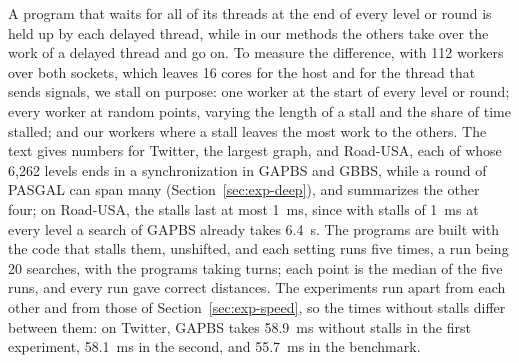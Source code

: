A program that waits for all of its threads at the end of every level or round is held up by each delayed thread, while in our methods the others take over the work of a delayed thread and go on. To measure the difference, with 112 workers over both sockets, which leaves 16 cores for the host and for the thread that sends signals, we stall on purpose: one worker at the start of every level or round; every worker at random points, varying the length of a stall and the share of time stalled; and our workers where a stall leaves the most work to the others. The text gives numbers for Twitter, the largest graph, and Road-USA, each of whose 6,262 levels ends in a synchronization in GAPBS and GBBS, while a round of PASGAL can span many (Section~\ref{sec:exp-deep}), and summarizes the other four; on Road-USA, the stalls last at most 1~ms, since with stalls of 1~ms at every level a search of GAPBS already takes 6.4~s. The programs are built with the code that stalls them, unshifted, and each setting runs five times, a run being 20 searches, with the programs taking turns; each point is the median of the five runs, and every run gave correct distances. The experiments run apart from each other and from those of Section~\ref{sec:exp-speed}, so the times without stalls differ between them: on Twitter, GAPBS takes 58.9~ms without stalls in the first experiment, 58.1~ms in the second, and 55.7~ms in the benchmark.




\newcommand{\stallplots}[3]{%
    \addplot[wfdo] table[x expr={\thisrow{#2} == 0 ? #3 : \thisrow{#2}}, y=wd] {#1};
    \addplot[wfdomem] table[x expr={\thisrow{#2} == 0 ? #3 : \thisrow{#2}}, y=mem] {#1};
    \addplot[gapbs] table[x expr={\thisrow{#2} == 0 ? #3 : \thisrow{#2}}, y=gapbs] {#1};
    \addplot[gbbs] table[x expr={\thisrow{#2} == 0 ? #3 : \thisrow{#2}}, y=gbbs] {#1};
    \addplot[pasgal] table[x expr={\thisrow{#2} == 0 ? #3 : \thisrow{#2}}, y=pasgal] {#1};
}

